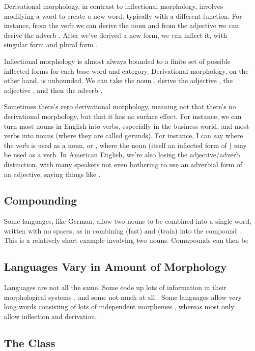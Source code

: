 Derivational morphology, in contrast to inflectional morphology,
involves modifying a word to create a new word, typically with a
different function.  For instance, from the verb 
we can derive the noun  and from the adjective
 we can derive the adverb
.  After we've derived a new form, we can
inflect it, with singular form  and plural form
.

Inflectional morphology is almost always bounded to a finite set of
possible inflected forms for each base word and category.  Derivational
morphology, on the other hand, is unbounded.  We can take the noun
, derive the adjective ,
the adjective , and then the adverb
.  

Sometimes there's zero derivational morphology, meaning not that
there's no derivational morphology, but that it has no surface effect.
For instance, we can turn most nouns in English into verbs, especially
in the business world, and most verbs into nouns (where they are
called gerunds).  For instance, I can say  where the verb  is used as a noun,
or , where the noun
 (itself an inflected form of
) may be used as a verb.  In American English,
we're also losing the adjective/adverb distinction, with many speakers
not even bothering to use an adverbial form of an adjective, saying
things like .  

\subsection{Compounding}

Some languages, like German, allow two nouns to be combined
into a single word, written with no spaces, as in combining
 (fast) and  (train)
into the compound .  This is a relatively
short example involving two nouns. Comnpounds can then be 


\subsection{Languages Vary in Amount of Morphology}

Languages are not all the same.  Some code up lots of information in
their morphological systems , and some not much at all
.  Some languages allow very long words consisting of
lots of independent morphemes , whereas most
only allow inflection and derivation.


\subsection{The  Class}

